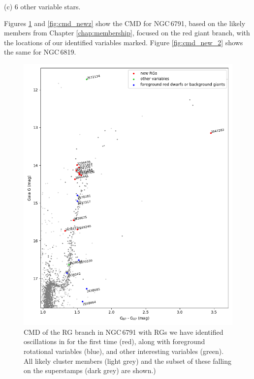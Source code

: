 (c) 6 other variable stars. 

Figures \ref{fig:cmd_new} and \ref{fig:cmd_newz} show the CMD for NGC\,6791, based on the likely members from Chapter \ref{chap:membership}, focused on the red giant branch, with the locations of our identified variables marked. Figure \ref{fig:cmd_new_2} shows the same for NGC\,6819.

\begin{figure}
    \centering
    \includegraphics[width=\linewidth]{Chapter5/6791_CMD.png}
    \caption[CMD of new variables in the RG branch in NGC 6791]{CMD of the RG branch in NGC\,6791 with RGs we have identified oscillations in for the first time (red), along with foreground rotational variables (blue), and other interesting variables (green). All likely cluster members (light grey) and the subset of these falling on the \Kepler{} superstamps (dark grey) are shown.)}
    \label{fig:cmd_new}
\end{figure}

